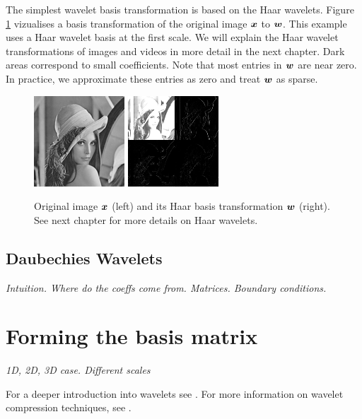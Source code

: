 The simplest wavelet basis transformation is based on the Haar wavelets.
Figure \ref{fig:haarlenna} vizualises a basis transformation of the original image $\boldsymbol x$ to $\boldsymbol w$. 
This example uses a Haar wavelet basis at the first scale.
We will explain the Haar wavelet transformations of images and videos in more detail in the next chapter.
Dark areas correspond to small coefficients.
Note that most entries in $\boldsymbol w$ are near zero. 
In practice, we approximate these entries as zero and treat $\boldsymbol w$ as sparse.

\begin{figure}
\label{fig:haarlenna}
\center
\includegraphics{Images/128.png}
\includegraphics{Images/haar.png}
\caption{Original image $\boldsymbol x$ (left) and its Haar basis transformation $\boldsymbol w$ (right). See next chapter for more details on Haar wavelets.}
\end{figure}

\subsection{Daubechies Wavelets}
\emph{Intuition. Where do the coeffs come from. Matrices. Boundary conditions.}


\section{Forming the basis matrix}
\emph{1D, 2D, 3D case. Different scales}

For a deeper introduction into wavelets see \cite{stollnitz1995}.
For more information on wavelet compression techniques, see \cite{devore1992}.


